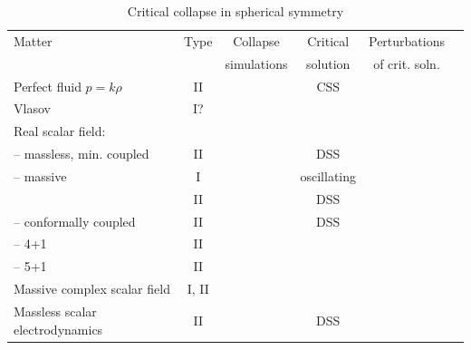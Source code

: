 \documentclass{article}
\begin{document}
\begin{table}

\caption{
\label{table:mattermodels}
Critical collapse in spherical symmetry}

\bigskip

\begin{tabular}{| l | c | c | c | c | c |}

\hline\hline

Matter & Type & Collapse  & Critical & Perturbations \\ 
& & simulations & solution & of crit. soln.\\

\hline\hline

Perfect fluid $p=k\rho$ & II & \cite{EvansColeman,NeilsenChoptuik} &
 CSS \cite{EvansColeman,Maison,NeilsenChoptuik} 
& \cite{Maison,KoikeHaraAdachi2,Gundlach_nonspherical,Gundlach_critfluid2} \\

Vlasov & I? & \cite{ReinRendallSchaeffer,OlabarrietaChoptuik} &
\cite{vlasov1} & \\
\hline

Real scalar field: &&&& \\
 
-- massless, min. coupled & II & \cite{Choptuik91,Choptuik92,Choptuik94} &

DSS \cite{Gundlach_Chop1} 
& \cite{Gundlach_Chop2,MartinGundlach} \\

-- massive & I & \cite{BradyChambersGoncalves} 
& oscillating \cite{SeidelSuen} & \\

& II & \cite{Choptuik94}
& DSS \cite{HaraKoikeAdachi,GundlachMartin} 
& \cite{HaraKoikeAdachi,GundlachMartin} \\ 

-- conformally coupled & II &
\cite{Choptuik92} & DSS  &   \\

-- 4+1 & II & \cite{Birukou} & & \\

-- 5+1 & II & \cite{GarfinkleCutlerDuncan} & & \\

\hline

Massive complex scalar field & I, II & \cite{HawleyChoptuik} &
\cite{SeidelSuen}& \cite{HawleyChoptuik} \\

Massless scalar electrodynamics & II & \cite{HodPiran_charge} &
DSS \cite{GundlachMartin} &
\cite{GundlachMartin} \\ 


\end{tabular}
\end{table}
\end{document}
